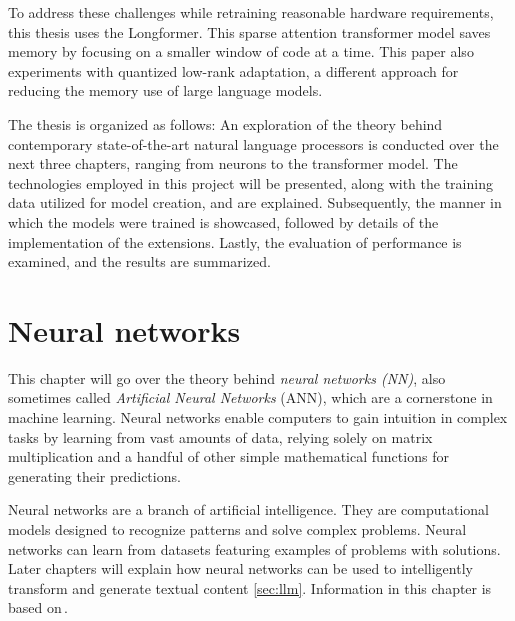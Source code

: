 To address these challenges while retraining reasonable hardware requirements, this thesis uses the Longformer. This sparse attention transformer model saves memory by focusing on a smaller window of code at a time. This paper also experiments with quantized low-rank adaptation, a different approach for reducing the memory use of large language models.

The thesis is organized as follows: An exploration of the theory behind contemporary state-of-the-art natural language processors is conducted over the next three chapters, ranging from neurons to the transformer model. The technologies employed in this project will be presented, along with the training data utilized for model creation, and are explained. Subsequently, the manner in which the models were trained is showcased, followed by details of the implementation of the extensions. Lastly, the evaluation of performance is examined, and the results are summarized.



\chapter{Neural networks}
\label{sec:neural_networks}

This chapter will go over the theory behind \emph{neural networks (NN)}, also sometimes called \emph{Artificial Neural Networks} (ANN), which are a cornerstone in machine learning. Neural networks enable computers to gain intuition in complex tasks by learning from vast amounts of data, relying solely on matrix multiplication and a handful of other simple mathematical functions for generating their predictions.

Neural networks are a branch of artificial intelligence. They are computational models designed to recognize patterns and solve complex problems. Neural networks can learn from datasets featuring examples of problems with solutions. Later chapters will explain how neural networks can be used to intelligently transform and generate textual content \ref{sec:llm}. Information in this chapter is based on\,\cite{DeepLearning2016}.

